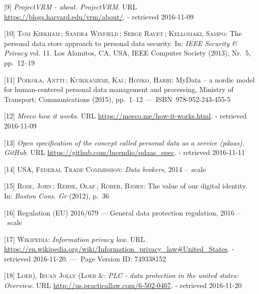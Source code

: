 \documentclass[12pt,english,a4paper,titlepage,cleardoublepage=empty,dottedtoc]{report}
\begin{document}
\hypertarget{ref-web_2010_projectvrm_about}{}
{[}9{]} \emph{ProjectVRM - about. ProjectVRM}. URL
\url{https://blogs.harvard.edu/vrm/about/}. - retrieved 2016-11-09

\hypertarget{ref-paper_2013_the-personal-data-store-approach-to-personal-data-security_2013}{}
{[}10{]} \textsc{Tom Kirkham}\,; \textsc{Sandra Winfield}\,;
\textsc{Serge Ravet}\,; \textsc{Kellomaki, Sampo}: The personal data
store approach to personal data security. In: \emph{IEEE Security \&
Privacy} vol. 11. Los Alamitos, CA, USA, IEEE Computer Society (2013),
Nr.~5, pp.~12--19

\hypertarget{ref-whitepaper_2014_mydata-a-nordic-model-for-human-centered-personal-data-management-and-processing}{}
{[}11{]} \textsc{Poikola, Antti}\,; \textsc{Kuikkaniemi, Kai}\,;
\textsc{Honko, Harri}: MyData -- a nordic model for human-centered
personal data management and processing, Ministry of Transport;
Communications (2015), pp.~1--12 ---~ISBN~978-952-243-455-5

\hypertarget{ref-web_2016_meeco-how-it-works}{}
{[}12{]} \emph{Meeco how it works}. URL
\url{https://meeco.me/how-it-works.html}. - retrieved 2016-11-09

\hypertarget{ref-repo_2016_pdaas-spec}{}
{[}13{]} \emph{Open specification of the concept called personal data as
a service (pdaas). GitHub}. URL
\url{https://github.com/lucendio/pdaas_spec}. - retrieved 2016-11-11

\hypertarget{ref-report_2014_data-brokers}{}
{[}14{]} \textsc{USA, Federal Trade Commission}: \emph{Data brokers},
2014 --~scale

\hypertarget{ref-whitepaper_2012_the-value-of-our-digital-identity_definition}{}
{[}15{]} \textsc{Rose, John}\,; \textsc{Rehse, Olaf}\,; \textsc{Röber,
Björn}: The value of our digital identity. In: \emph{Boston Cons. Gr}
(2012), p.~36

\hypertarget{ref-regulation_2016_eu_general-data-protection-regulation_definition}{}
{[}16{]} Regulation (EU) 2016/679 --- General data protection
regulation, 2016 --~scale

\hypertarget{ref-web_2016_wikipedia_information-privacy-law_us}{}
{[}17{]} \textsc{Wikipedia}: \emph{Information privacy law}. URL
\url{https://en.wikipedia.org/wiki/Information_privacy_law\#United_States}.
- retrieved 2016-11-20. ---~Page Version ID: 749338152

\hypertarget{ref-web_2016_data-protection-laws-in-the-us}{}
{[}18{]} \textsc{Loeb), Ieuan Jolly (Loeb \&}: \emph{PLC - data
protection in the united states: Overview}. URL
\url{http://us.practicallaw.com/6-502-0467}. - retrieved 2016-11-20
\end{document}
